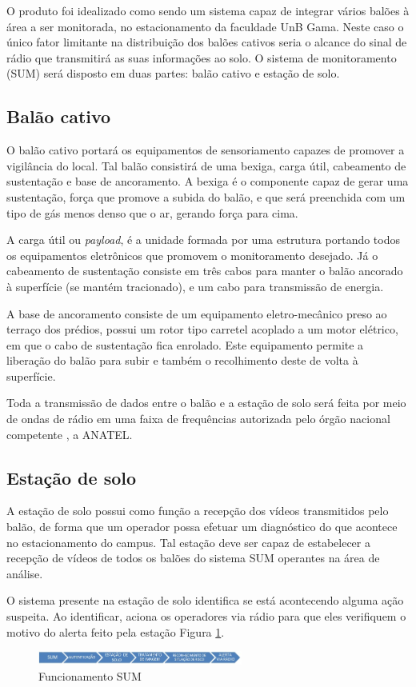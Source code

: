 O produto foi idealizado como sendo um sistema capaz de integrar vários balões à área a ser monitorada,  no estacionamento da faculdade UnB Gama. Neste caso o único fator limitante na distribuição dos balões cativos seria o alcance do sinal de rádio que transmitirá as suas informações ao solo. O sistema de monitoramento (SUM) será disposto em duas partes: balão cativo e estação de solo.

\subsection{Balão cativo}

O balão cativo portará os equipamentos de sensoriamento capazes de promover a vigilância do local. Tal balão  consistirá de uma bexiga, carga útil, cabeamento de sustentação e base de ancoramento. A bexiga é o componente capaz de gerar uma sustentação, força que promove a subida do balão, e que será preenchida com um tipo de gás menos denso que o ar, gerando força para cima.

A carga útil ou \textit{payload}, é a unidade formada por uma estrutura portando todos  os equipamentos eletrônicos que promovem o monitoramento desejado. Já o cabeamento de sustentação consiste em  três cabos para manter o balão ancorado à superfície (se mantém tracionado), e um cabo para  transmissão de energia.

A base de ancoramento consiste de um equipamento eletro-mecânico preso ao terraço dos prédios, possui um rotor tipo carretel acoplado a um motor elétrico, em que o cabo de sustentação fica enrolado. Este equipamento permite a liberação do balão para subir e também o recolhimento deste de volta à superfície.

Toda a transmissão de dados entre o balão e a estação de solo será feita por meio de ondas de rádio em uma faixa de frequências autorizada pelo órgão nacional competente , a ANATEL.

\subsection{Estação de solo}

A estação de solo possui como função a recepção dos vídeos transmitidos pelo balão, de forma que um operador possa efetuar um diagnóstico do que acontece no estacionamento do campus. Tal estação deve ser capaz de estabelecer a recepção de vídeos de todos os balões do sistema SUM operantes na área de análise.

O sistema presente na estação de solo identifica se  está acontecendo alguma ação suspeita. Ao identificar,  aciona os operadores via rádio  para que eles verifiquem o motivo do alerta feito pela estação Figura \ref{img:processo}.


\begin{figure}[H]
	\centering
	\includegraphics[width=0.6\textwidth]{figuras/processo}
	\caption{Funcionamento SUM}
	\label{img:processo}
\end{figure}
